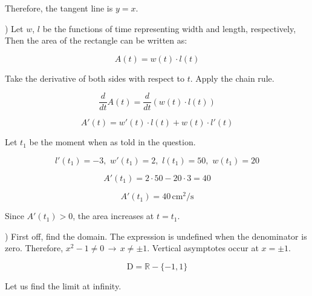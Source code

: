 \documentclass{article}
\begin{document}
\hfill

\noindent Therefore, the tangent line is $\boxed{y=x}$.

\hfill

) Let $w$, $l$ be the functions of time representing width and length, respectively, Then the area of the rectangle can be written as:

\begin{equation*}
A(t) = w(t)\cdot l(t)
\end{equation*}

\hfill

\noindent Take the derivative of both sides with respect to $t$. Apply the chain rule.

\begin{equation*}\frac{d}{dt}A(t) = \frac{d}{dt}(w(t)\cdot l(t))\end{equation*}

\begin{equation*}A'(t) = w'(t)\cdot l(t) + w(t)\cdot l'(t)\end{equation*}

\hfill

\noindent Let $t_1$ be the moment when as told in the question.

\begin{equation*}l'(t_1) = -3,\,\,w'(t_1) = 2,\,\,l(t_1) = 50,\,\, w(t_1) = 20\end{equation*}

\begin{equation*}A'(t_1) = 2\cdot 50 - 20\cdot 3 = 40\end{equation*}

\begin{equation*}\boxed{A'(t_1) = 40\, \text{cm}^2/\text{s}}\end{equation*}

\hfill

\noindent Since $A'(t_1) > 0$, the area increases at $t=t_1$.

\hfill

) First off, find the domain. The expression is undefined when the denominator is zero. Therefore, $x^2-1 \neq 0 \,\rightarrow\, x\neq \pm 1$. Vertical asymptotes occur at $x = \pm 1$.

\begin{equation*}\text{D} = \mathbb{R} - \{-1, 1\} \end{equation*}

\hfill

\noindent Let us find the limit at infinity.
\end{document}
